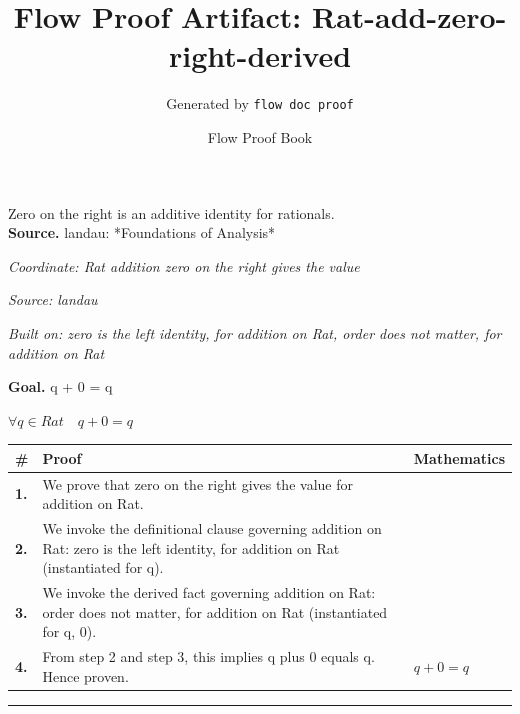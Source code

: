 \documentclass[11pt]{article}
\title{Flow Proof Artifact: Rat-add-zero-right-derived}
\author{Generated by \texttt{flow doc proof}}
\date{Flow Proof Book}
\theoremstyle{definition}
\begin{document}
\maketitle
Zero on the right is an additive identity for rationals.\\[0.5em]
\textbf{Source.} landau: *Foundations of Analysis*\\[0.5em]
\bigskip
{}\par
\smallskip\noindent\textit{Coordinate: Rat \cdot addition \cdot zero on the right gives the value}\par
\smallskip\noindent\textit{Source: landau}\par
\smallskip\noindent\textit{Built on: zero is the left identity, for addition on Rat, order does not matter, for addition on Rat}\par
\medskip
\noindent\textbf{Goal.} q + 0 = q\par
\noindent$\displaystyle \forall q \in Rat\quad q + 0 = q$\par
\medskip
\noindent
\begin{tabular}{@{} >{\raggedright\arraybackslash}p{} >{\raggedright\arraybackslash}p{} >{\raggedleft\arraybackslash}p{} @{}}
\textbf{\#} & \textbf{Proof} & \textbf{Mathematics} \\
\midrule
\textbf{1.} & We prove that zero on the right gives the value for addition on Rat. & \\[0.45em]
\textbf{2.} & We invoke the definitional clause governing addition on Rat: zero is the left identity, for addition on Rat (instantiated for q). & \\[0.45em]
\textbf{3.} & We invoke the derived fact governing addition on Rat: order does not matter, for addition on Rat (instantiated for q, 0). & \\[0.45em]
\textbf{4.} & From step 2 and step 3, this implies q plus 0 equals q. Hence proven. & $\displaystyle q + 0 = q$ \\[0.45em]
\bottomrule
\end{tabular}
\label{thm:Rat-addition-zero_on_the_right_gives_the_value}
\par\medskip\hrule
\end{document}

